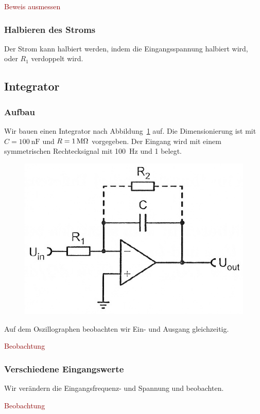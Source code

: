 \textcolor{darkred}{Beweis ausmessen}

\subsubsection{Halbieren des Stroms}

Der Strom kann halbiert werden, indem die Eingangsspannung halbiert wird, oder
$R_1$ verdoppelt wird.

\FloatBarrier
\subsection{Integrator}

\subsubsection{Aufbau}

Wir bauen einen Integrator nach Abbildung~\ref{fig:5_6-11} auf. Die
Dimensionierung ist mit $C = \SI{100}{\nano\farad}$ und $R = \SI1{\mega\ohm}$
vorgegeben. Der Eingang wird mit einem symmetrischen Rechtecksignal mit
\SI{100}{\hertz} und \SI{1}{\voltss} belegt.

\begin{figure}[htbp]
	\centering
	\includegraphics[width=.5\linewidth]{Anleitung/5_6-11.png}
	\caption{%
		\cite[Abbildung~5/6.11]{physik313-Anleitung}
	}
	\label{fig:5_6-11}
\end{figure}

Auf dem Oszillographen beobachten wir Ein- und Ausgang gleichzeitig.

\textcolor{darkred}{Beobachtung}

\subsubsection{Verschiedene Eingangswerte}

Wir verändern die Eingangsfrequenz- und Spannung und beobachten.

\textcolor{darkred}{Beobachtung}

